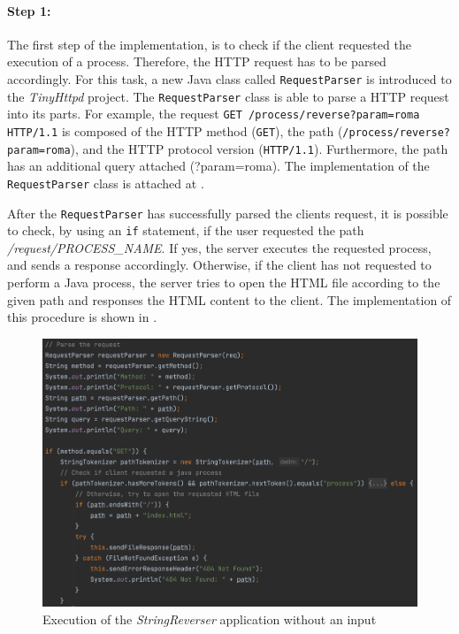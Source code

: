 \paragraph{Step 1:}
The first step of the implementation, is to check if the client requested the execution of a process. Therefore, the HTTP request has to be parsed accordingly. For this task, a new Java class called \texttt{RequestParser} is introduced to the \textit{TinyHttpd} project. The \texttt{RequestParser} class is able to parse a HTTP request into its parts. For example, the request \texttt{GET /process/reverse?param=roma HTTP/1.1} is composed of the HTTP method (\texttt{GET}), the path (\texttt{/process/reverse?param=roma}), and the HTTP protocol version (\texttt{HTTP/1.1}). Furthermore, the path has an additional query attached (?param=roma). The implementation of the \texttt{RequestParser} class is attached at .


After the \texttt{RequestParser} has successfully parsed the clients request, it is possible to check, by using an \texttt{if} statement, if the user requested the path \textit{/request/PROCESS\_NAME}. If yes, the server executes the requested process, and sends a response accordingly. Otherwise, if the client has not requested to perform a Java process, the server tries to open the HTML file according to the given path and responses the HTML content to the client. The implementation of this procedure is shown in .
\begin{figure}[h]
\centering
\includegraphics[scale=0.4]{images/TinyHttpdParsing}
\caption{Execution of the \textit{StringReverser} application without an input}
\label{fig:01_part1_impl_tinyhttpd_parsing}
\end{figure}



